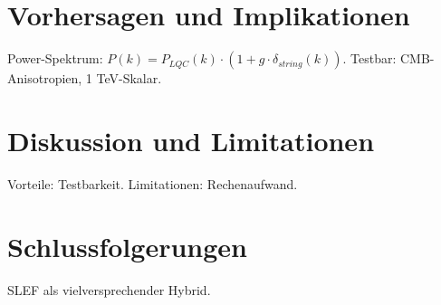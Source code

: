 \documentclass[11pt,a4paper]{article}
\begin{document}
	\section{Vorhersagen und Implikationen}
	Power-Spektrum: $P(k) = P_{LQC}(k) \cdot (1 + g \cdot \delta_{string}(k))$. Testbar: CMB-Anisotropien, 1 TeV-Skalar.
	
	\section{Diskussion und Limitationen}
	Vorteile: Testbarkeit. Limitationen: Rechenaufwand.
	
	\section{Schlussfolgerungen}
	SLEF als vielversprechender Hybrid.
	
	
	
	
\end{document}
